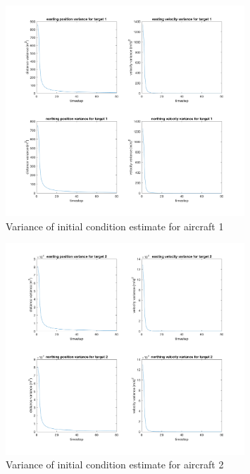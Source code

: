 \documentclass[11pt]{article}
\begin{document}
\begin{figure}[h]
	\centering
	\includegraphics[width=0.8\textwidth]{prob3c_plt3.png}
	\caption{Variance of initial condition estimate for aircraft 1}
	\label{sigmaA}
\end{figure}
\begin{figure}[h]
	\centering
	\includegraphics[width=0.8\textwidth]{prob3c_plt4.png}
	\caption{Variance of initial condition estimate for aircraft 2}
	\label{sigmaB}
\end{figure}
\end{document}
